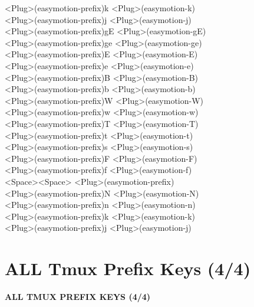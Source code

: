 \documentclass[11pt,a4paper,twoside]{book}
\begin{document}
<Plug>(easymotion-prefix)k  <Plug>(easymotion-k)\\
<Plug>(easymotion-prefix)j  <Plug>(easymotion-j)\\
<Plug>(easymotion-prefix)gE  <Plug>(easymotion-gE)\\
<Plug>(easymotion-prefix)ge  <Plug>(easymotion-ge)\\
<Plug>(easymotion-prefix)E  <Plug>(easymotion-E)\\
<Plug>(easymotion-prefix)e  <Plug>(easymotion-e)\\
<Plug>(easymotion-prefix)B  <Plug>(easymotion-B)\\
<Plug>(easymotion-prefix)b  <Plug>(easymotion-b)\\
<Plug>(easymotion-prefix)W  <Plug>(easymotion-W)\\
<Plug>(easymotion-prefix)w  <Plug>(easymotion-w)\\
<Plug>(easymotion-prefix)T  <Plug>(easymotion-T)\\
<Plug>(easymotion-prefix)t  <Plug>(easymotion-t)\\
<Plug>(easymotion-prefix)s  <Plug>(easymotion-s)\\
<Plug>(easymotion-prefix)F  <Plug>(easymotion-F)\\
<Plug>(easymotion-prefix)f  <Plug>(easymotion-f)\\
<Space><Space>  <Plug>(easymotion-prefix)\\
<Plug>(easymotion-prefix)N  <Plug>(easymotion-N)\\
<Plug>(easymotion-prefix)n  <Plug>(easymotion-n)\\
<Plug>(easymotion-prefix)k  <Plug>(easymotion-k)\\
<Plug>(easymotion-prefix)j  <Plug>(easymotion-j)\\


\vspace{16pt}

\section{ALL Tmux Prefix Keys (4/4)}


\vspace{10pt}
{\large\bfseries\color{neoncyan} ALL TMUX PREFIX KEYS (4/4)}\vspace{6pt}
\end{document}
